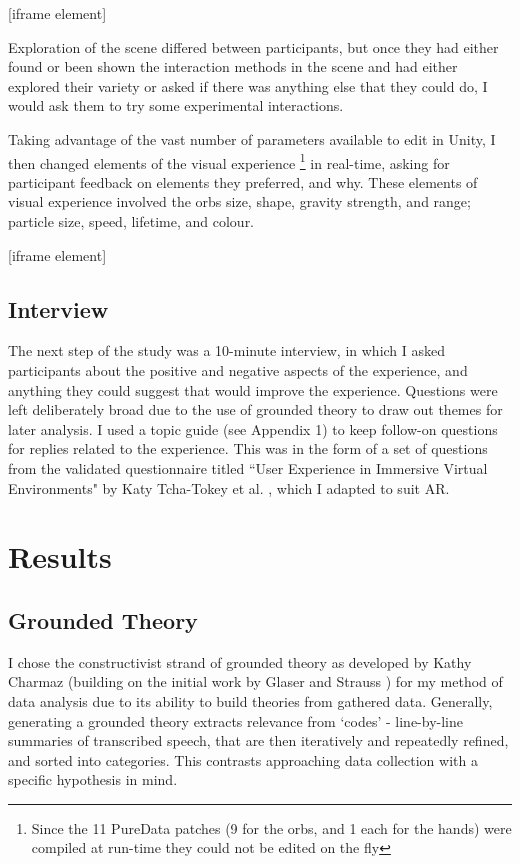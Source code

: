 [iframe element]

Exploration of the scene differed between participants, but once they had either found or been shown the interaction methods in the scene and had either explored their variety or asked if there was anything else that they could do, I would ask them to try some experimental interactions.

Taking advantage of the vast number of parameters available to edit in Unity, I then changed elements of the visual   experience \footnote{Since the 11 PureData patches (9 for the orbs, and 1 each for the hands) were compiled at run-time they could not be edited on the fly} in real-time, asking for participant feedback on elements they preferred, and why. These elements of visual experience involved the orbs size, shape, gravity strength, and range; particle size, speed, lifetime, and colour.

[iframe element]

\subsection{Interview}\label{sec: polaris-study-interview}
The next step of the study was a 10-minute interview, in which I asked participants about the positive and negative aspects of the experience, and anything they could suggest that would improve the experience. Questions were left deliberately broad due to the use of grounded theory to draw out themes for later analysis. I used a topic guide (see Appendix 1) to keep follow-on questions for replies related to the experience. This was in the form of a set of questions from the validated questionnaire titled ``User Experience in Immersive Virtual Environments" by Katy Tcha-Tokey et al. \citeyearpar{tcha-tokey2016a}, which I adapted to suit AR.

\section{Results}\label{sec: polaris-feedback}
\subsection{Grounded Theory}\label{sec: polaris-feedback-grounded}
I chose the constructivist strand of grounded theory as developed by Kathy Charmaz \citeyearpar{charmaz2006} (building on the initial work by Glaser and Strauss \citeyearpar{glaser1967}) for my method of data analysis due to its ability to build theories from gathered data. Generally, generating a grounded theory extracts relevance from ‘codes’ - line-by-line summaries of transcribed speech, that are then iteratively and repeatedly refined, and sorted into categories. This contrasts approaching data collection with a specific hypothesis in mind.

